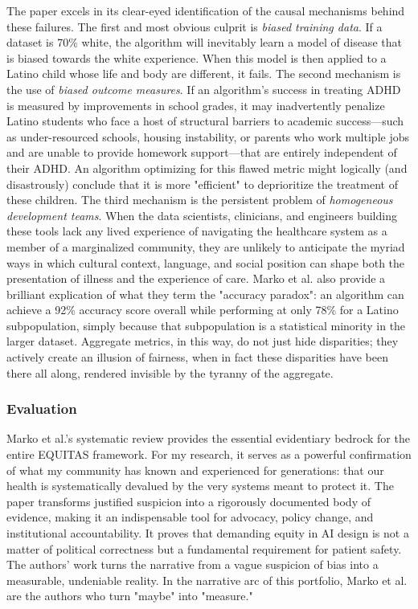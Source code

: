 \documentclass[11pt,twoside]{article}
\begin{document}
The paper excels in its clear-eyed identification of the causal mechanisms behind these failures. The first and most obvious culprit is \textit{biased training data}. If a dataset is 70\% white, the algorithm will inevitably learn a model of disease that is biased towards the white experience. When this model is then applied to a Latino child whose life and body are different, it fails. The second mechanism is the use of \textit{biased outcome measures}. If an algorithm's success in treating ADHD is measured by improvements in school grades, it may inadvertently penalize Latino students who face a host of structural barriers to academic success—such as under-resourced schools, housing instability, or parents who work multiple jobs and are unable to provide homework support—that are entirely independent of their ADHD. An algorithm optimizing for this flawed metric might logically (and disastrously) conclude that it is more "efficient" to deprioritize the treatment of these children. The third mechanism is the persistent problem of \textit{homogeneous development teams}. When the data scientists, clinicians, and engineers building these tools lack any lived experience of navigating the healthcare system as a member of a marginalized community, they are unlikely to anticipate the myriad ways in which cultural context, language, and social position can shape both the presentation of illness and the experience of care. Marko et al. also provide a brilliant explication of what they term the "accuracy paradox": an algorithm can achieve a 92\% accuracy score overall while performing at only 78\% for a Latino subpopulation, simply because that subpopulation is a statistical minority in the larger dataset. Aggregate metrics, in this way, do not just hide disparities; they actively create an illusion of fairness, when in fact these disparities have been there all along, rendered invisible by the tyranny of the aggregate.

\subsubsection*{Evaluation}

\vspace{-0.3cm}
Marko et al.'s systematic review provides the essential evidentiary bedrock for the entire EQUITAS framework. For my research, it serves as a powerful confirmation of what my community has known and experienced for generations: that our health is systematically devalued by the very systems meant to protect it. The paper transforms justified suspicion into a rigorously documented body of evidence, making it an indispensable tool for advocacy, policy change, and institutional accountability. It proves that demanding equity in AI design is not a matter of political correctness but a fundamental requirement for patient safety. The authors’ work turns the narrative from a vague suspicion of bias into a measurable, undeniable reality. In the narrative arc of this portfolio, Marko et al. are the authors who turn "maybe" into "measure."
\end{document}
